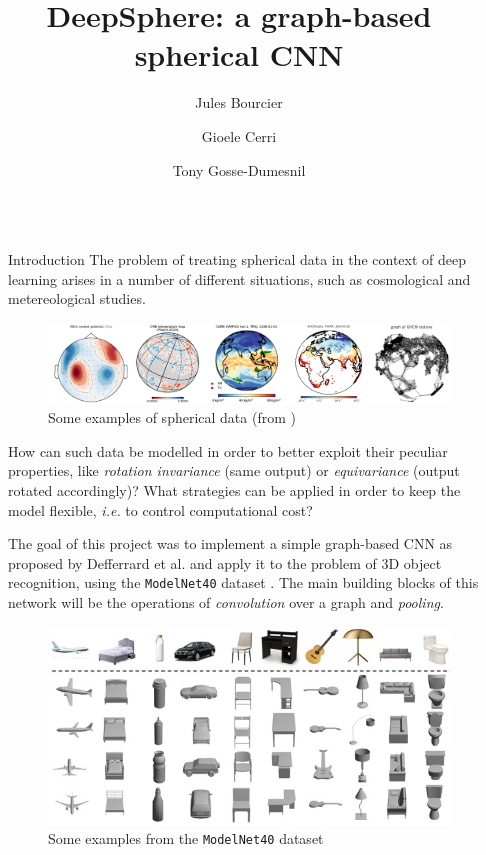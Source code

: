 \documentclass[final]{beamer}
\title{DeepSphere: a graph-based spherical CNN}
\author{Jules Bourcier \and Gioele Cerri \and Tony Gosse-Dumesnil}
\institute[shortinst]{Sorbonne Université -- Paris }
\newlength{\sepwidth}
\newlength{\colwidth}
\newcommand{\separatorcolumn}{\begin{column}{\sepwidth}\end{column}}
\begin{document}
\begin{frame}[t]
\begin{columns}[t]
\separatorcolumn

\begin{column}{\colwidth}
  \begin{block}{Introduction}
    The problem of treating spherical data in the context of deep learning arises in a number of different situations, such as cosmological and metereological studies.
    
    \begin{figure}[h]
      \includegraphics[width=\colwidth]{maps.png}
      \caption{Some examples of spherical data (from \cite{deepsphere_iclr:2019})}
    \end{figure}

    How can such data be modelled in order to better exploit their peculiar properties, like \emph{rotation invariance} (same output) or \emph{equivariance} (output rotated accordingly)? What strategies can be applied in order to keep the model flexible, \emph{i.e.} to control computational cost?

    The goal of this project was to implement a simple graph-based CNN as proposed by Defferrard et al. \cite{deepsphere_iclr:2019} and apply it to the problem of 3D object recognition, using the \texttt{ModelNet40} dataset \cite{modelnet}.
    The main building blocks of this network will be the operations of \emph{convolution} over a graph and \emph{pooling}.

    \begin{figure}[h]
      \includegraphics[width=0.7\colwidth]{modelnet40-crop.png}
      \caption{Some examples from the \texttt{ModelNet40} dataset}
    \end{figure}
  \end{block}


\end{column}
\end{columns}
\end{frame}
\end{document}
